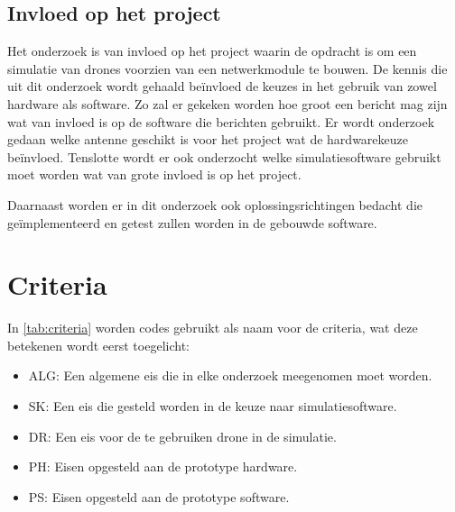 \documentclass[a4paper, 11pt, oneside]{report}
\begin{document}
\section{Invloed op het project}

Het onderzoek is van invloed op het project waarin de opdracht is om een simulatie van drones voorzien van een netwerkmodule te bouwen.
De kennis die uit dit onderzoek wordt gehaald beïnvloed de keuzes in het gebruik van zowel hardware als software. 
Zo zal er gekeken worden hoe groot een bericht mag zijn wat van invloed is op de software die berichten gebruikt.
Er wordt onderzoek gedaan welke antenne geschikt is voor het project wat de hardwarekeuze beïnvloed.
Tenslotte wordt er ook onderzocht welke simulatiesoftware gebruikt moet worden wat van grote invloed is op het project.

Daarnaast worden er in dit onderzoek ook oplossingsrichtingen bedacht die geïmplementeerd en getest zullen worden in de gebouwde software. 

\chapter{Criteria}
\label{chapter:criteria}

In \autoref{tab:criteria} worden codes gebruikt als naam voor de criteria, wat deze betekenen wordt eerst toegelicht:
\begin{itemize}
	\item ALG: Een algemene eis die in elke onderzoek meegenomen moet worden.
	\item SK: Een eis die gesteld worden in de keuze naar simulatiesoftware.
	\item DR: Een eis voor de te gebruiken drone in de simulatie.
	\item PH: Eisen opgesteld aan de prototype hardware.
	\item PS: Eisen opgesteld aan de prototype software.
\end{itemize}
\end{document}
